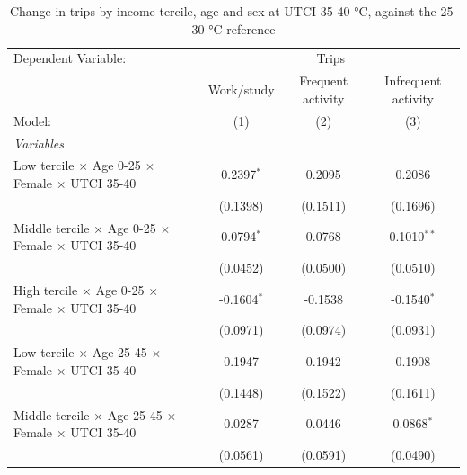 
\begin{table}[htbp]
   \caption{\label{table_intersectionality_35-40} Change in trips by income tercile, age and sex at UTCI 35-40 °C, against the 25-30 °C reference}
   \centering
   \scriptsize
   \renewcommand*{\arraystretch}{0.75}
   \begin{tabular}{lccc}
      \tabularnewline \midrule \midrule
      Dependent Variable: & \multicolumn{3}{c}{Trips}\\
                                                                                & Work/study     & Frequent activity & Infrequent activity \\   
      Model:                                                                    & (1)            & (2)               & (3)\\  
      \midrule
      \emph{Variables}\\
      Low tercile $\times$ Age 0-25 $\times$ Female $\times$ UTCI 35-40         & 0.2397$^{*}$   & 0.2095            & 0.2086\\   
                                                                                & (0.1398)       & (0.1511)          & (0.1696)\\   
      Middle tercile $\times$ Age 0-25 $\times$ Female $\times$ UTCI 35-40      & 0.0794$^{*}$   & 0.0768            & 0.1010$^{**}$\\   
                                                                                & (0.0452)       & (0.0500)          & (0.0510)\\   
      High tercile $\times$ Age 0-25 $\times$ Female $\times$ UTCI 35-40        & -0.1604$^{*}$  & -0.1538           & -0.1540$^{*}$\\   
                                                                                & (0.0971)       & (0.0974)          & (0.0931)\\   
      Low tercile $\times$ Age 25-45 $\times$ Female $\times$ UTCI 35-40        & 0.1947         & 0.1942            & 0.1908\\   
                                                                                & (0.1448)       & (0.1522)          & (0.1611)\\   
      Middle tercile $\times$ Age 25-45 $\times$ Female $\times$ UTCI 35-40     & 0.0287         & 0.0446            & 0.0868$^{*}$\\   
                                                                                & (0.0561)       & (0.0591)          & (0.0490)\\   

\end{tabular}
\end{table}
